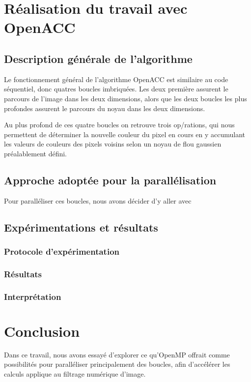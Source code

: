 \documentclass[11pt]{report}
\begin{document}
\clearpage
\chapter{Réalisation du travail avec\\ OpenACC}
	
	\section{Description générale de l'algorithme}
		Le fonctionnement général de l'algorithme OpenACC est similaire au code séquentiel, donc quatres boucles imbriquées. Les deux première assurent le parcours de l'image dans les deux dimensions, alors que les deux boucles les plus profondes assurent le parcours du noyau dans les deux dimensions. 
		
		\bigskip
		Au plus profond de ces quatre boucles on retrouve trois op/rations, qui nous permettent de déterminer la nouvelle couleur du pixel en cours en y accumulant les valeurs de couleurs des pixels voisins selon un noyau de flou gaussien préalablement défini.
	
	\section{Approche adoptée pour la parallélisation }
		Pour paralléliser ces boucles, nous avons décider d'y aller avec
	
	\section{Expérimentations et résultats}
	
		\subsection{Protocole d'expérimentation}
		
		\subsection{Résultats}
		
		\subsection{Interprétation}


\chapter{Conclusion}

Dans ce travail, nous avons essayé d'explorer ce qu'OpenMP offrait comme possibilités pour
paralléliser principalement des boucles, afin d'accélérer les calculs applique au filtrage
numérique d'image.
\end{document}
